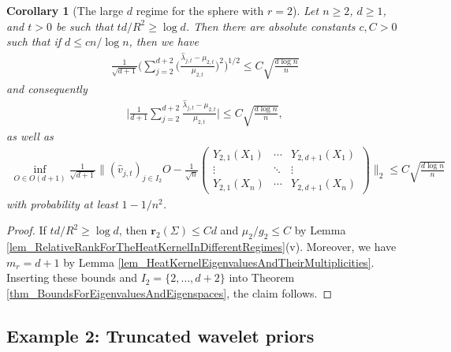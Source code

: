 \documentclass[a4paper,11pt]{article} %
\numberwithin{equation}{section}
\theoremstyle{definition}
\theoremstyle{remark}
\theoremstyle{plain}
\newtheorem{corollary}[definition]{Corollary}
\begin{document}
\begin{corollary}[The large $ d $ regime for the sphere with $r=2$]%
  Let $n\geq 2$, $ d \ge 1$, and $t > 0$ be such that \( t d / R^2 \ge \log d \).
  Then there are absolute constants $c, C >0$ such that if $d \le c n / \log n$, then we have
  \begin{align}
      \frac{1}{\sqrt{d + 1}}
      \Big(\sum_{j = 2}^{d + 2} \Big(\frac{\widehat{\lambda}_{j, t}-\mu_{2, t}}{\mu_{2, t}} \Big)^2 \Big)^{1/2}
  \le 
      C  \sqrt{\frac{d \log n}{n}}
  \end{align}
  and consequently
  \begin{align}
      \Big| \frac{1}{d + 1} \sum_{j = 2}^{d+2} \frac{\widehat{\lambda}_{j, t}-\mu_{2, t}}{\mu_{2, t}}  \Big|
  \le 
      C \sqrt{\frac{d \log n}{n}},
  \end{align}
  as well as
  \begin{align}
     \inf_{O \in O(d+1)} 
  \frac{1}{\sqrt{d+1}}\Bigg\| (\widehat v_{j,t})_{j\in I_2}O - \frac{1}{\sqrt{n}}  \begin{pmatrix}
                                                         Y_{2,1}(X_1) & \cdots & Y_{2,d+1}(X_1) \\ 
                                                         \vdots   & \ddots & \vdots   \\
                                                         Y_{2,1}(X_n) & \cdots & Y_{2,d+1}(X_n)
                                                       \end{pmatrix} 
  \Bigg\|_2
  \le 
  C \sqrt{ \frac{d\log n}{n}
                            } 
  \end{align}
  with probability at least $1 - 1/n^{2}$.
\end{corollary}%

\begin{proof}
    If \( t d / R^2 \ge \log d \), then $\mathbf{r}_2(\Sigma)\leq Cd$ and $\mu_2/g_2\leq C$ by Lemma \ref{lem_RelativeRankForTheHeatKernelInDifferentRegimes}(v). Moreover, we have $m_r=d+1$ by Lemma \ref{lem_HeatKernelEigenvaluesAndTheirMultiplicities}. Inserting these bounds and $I_2=\{2,\dots,d+2\}$ into Theorem \ref{thm_BoundsForEigenvaluesAndEigenspaces}, the claim follows.
\end{proof}



\subsection{Example 2: Truncated wavelet priors}%
\label{ssec_TruncatedWaveletPriors}
\end{document}
